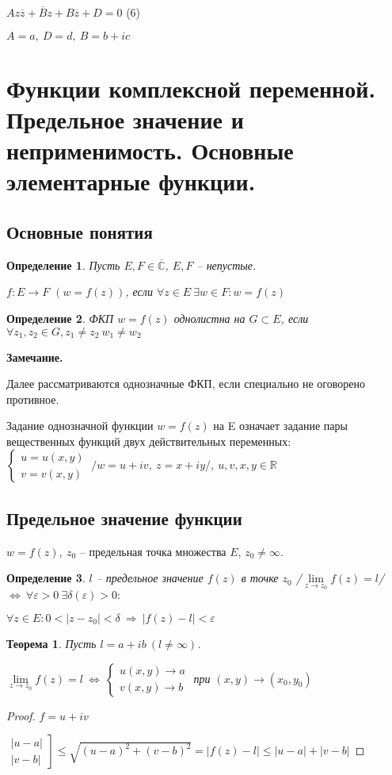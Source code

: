 \documentclass[draft]{article}
\newcommand{\then}{\ \Rightarrow\ }
\newcommand{\R}{\mathbb{R}}
\renewcommand{\C}{\mathbb{C}}
\newcommand{\mlim}[1]{\underset{#1}{\lim}}
\newcommand{\LRA}{\Leftrightarrow}
\renewcommand{\bar}{\overline}
\newcommand{\e}{\varepsilon}
\newcommand{\z}{\bar{z}}
\newcommand{\CC}{\bar{\C}}
\newcommand{\sys}[1]{\left\{\begin{matrix}#1\end{matrix}\right.}
\newcommand{\opr}[1]{\begin{opred}#1\end{opred}}
\newtheorem*{theor}{Теорема}
\newtheorem*{opred}{Определение}
\theoremstyle{remark}
\begin{document}
$Az\z+\bar{B}z+B\z+D=0$ (6)

$A=a,\ D=d,\ B=b+ic$

\newpage

\section{Функции комплексной переменной. Предельное значение и неприменимость. Основные элементарные функции.}

\subsection{Основные понятия}

\opr{Пусть $E,F\in\CC$, $E,F$ -- непустые.

$f\colon E\to F$ $(w=f(z))$, если $\forall z\in E\ \exists w\in F\colon w=f(z)$}

\opr{ФКП $w=f(z)$ однолистна на $G\subset E$, если $\forall z_1,z_2\in G,z_1\neq z_2\ w_1\neq w_2$}

{\bfseries Замечание.}

Далее рассматриваются однозначные ФКП, если специально не оговорено противное.

Задание однозначной функции $w=f(z)$ на E означает задание пары вещественных функций двух действительных переменных: $\sys{u=u(x,y)\\v=v(x,y)}\ /w=u+iv,\ z=x+iy/,\ u,v,x,y\in\R$

\subsection{Предельное значение функции}

$w=f(z),\ z_0$ -- предельная точка множества $E$, $z_0\neq\infty$.

\opr{$l$ -- предельное значение $f(z)$ в точке $z_0$ /$\mlim{z\to z_0}f(z)=l$/ $\LRA\ \forall\e>0\ \exists\delta(\e)>0\colon$

$\forall z\in E\colon 0<|z-z_0|<\delta \then |f(z)-l|<\e$}

\begin{theor}
Пусть $l=a+ib\ (l\neq\infty)$.

$\mlim{z\to z_0}f(z)=l\ \LRA\ \sys{u(x,y)\to a \\ v(x,y)\to b}$ при $(x,y)\to(x_0,y_0)$
\end{theor}

\begin{proof}
$f=u+iv$

$\left.\begin{matrix}|u-a|\\|v-b|\end{matrix}\right]\leq\sqrt{(u-a)^2+(v-b)^2}=|f(z)-l|\leq|u-a|+|v-b|$
\end{proof}
\end{document}
